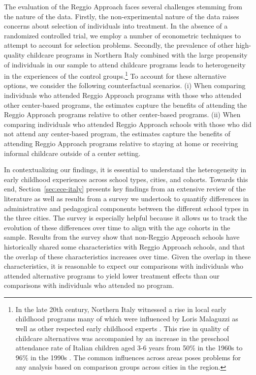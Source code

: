 The evaluation of the Reggio Approach faces several challenges stemming from the nature of the data. Firstly, the non-experimental nature of the data raises concerns about selection of individuals into treatment. In the absence of a randomized controlled trial, we employ a number of econometric techniques to attempt to account for selection problems. Secondly, the prevalence of other high-quality childcare programs in Northern Italy combined with the large propensity of individuals in our sample to attend childcare programs leads to heterogeneity in the experiences of the control groups.\footnote{In the late 20th century, Northern Italy witnessed a rise in local early childhood programs many of which were influenced by Loris Malaguzzi as well as other respected early childhood experts \citep{OECD_2001_Italy-Country-Note}. This rise in quality of childcare alternatives was accompanied by an increase in the preschool attendance rate of Italian children aged 3-6 years from 50\% in the 1960s to 96\% in the 1990s \citep{Hohnerlein_2015_Development-and-Diffusion}. The common influences across areas poses problems for any analysis based on comparison groups across cities in the region.} To account for these alternative options, we consider the following counterfactual scenarios. (i) When comparing individuals who attended Reggio Approach programs with those who attended other center-based programs, the estimates capture the benefits of attending the Reggio Approach programs relative to other center-based programs. (ii) When comparing individuals who attended Reggio Approach schools with those who did not attend any center-based program, the estimates capture the benefits of attending Reggio Approach programs relative to staying at home or receiving informal childcare outside of a center setting.

In contextualizing our findings, it is essential to understand the heterogeneity in early childhood experiences across school types, cities, and cohorts. Towards this end, Section~\ref{sec:ece-italy} presents key findings from an extensive review of the literature as well as results from a survey we undertook to quantify differences in administrative and pedagogical components between the different school types in the three cities. The survey is especially helpful because it allows us to track the evolution of these differences over time to align with the age cohorts in the sample. Results from the survey show that non-Reggio Approach schools have historically shared some characteristics with Reggio Approach schools, and that the overlap of these characteristics increases over time. Given the overlap in these characteristics, it is reasonable to expect our comparisons with individuals who attended alternative programs to yield lower treatment effects than our comparisons with individuals who attended no program.

